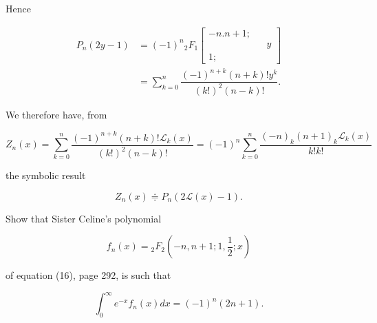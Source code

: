 \begin{solution}
Hence

$$\begin{array}{ll}
P_n(2y-1) &= (-1)^n {}_2F_1 \left[ \begin{array}{rlr}
-n. n+1; & & \\
& & y \\
1; & & 
\end{array} \right] \\
&= \displaystyle\sum_{k=0}^n \dfrac{(-1)^{n+k} (n+k)! y^k}{(k!)^2 (n-k)!}.
\end{array}$$

We therefore have, from

$$Z_n(x) = \displaystyle\sum_{k=0}^n \dfrac{(-1)^{n+k} (n+k)! \mathscr{L}_k(x)}{(k!)^2 (n-k)!} = (-1)^n \displaystyle\sum_{k=0}^n \dfrac{(-n)_k (n+1)_k \mathscr{L}_k(x)}{k! k!}$$

the symbolic result

$$Z_n(x) \doteqdot P_n(2 \mathscr{L}(x) -1).$$
\end{solution}
\begin{problem}\label{problem7chapter18}
Show that Sister Celine's polynomial

$$f_n(x) = {}_2F_2 \left(-n,n+1;1, \dfrac{1}{2};x \right)$$

of equation (16), page 292, is such that

$$\displaystyle\int_0^{\infty} e^{-x} f_n(x) dx = (-1)^n (2n+1).$$
\end{problem}
